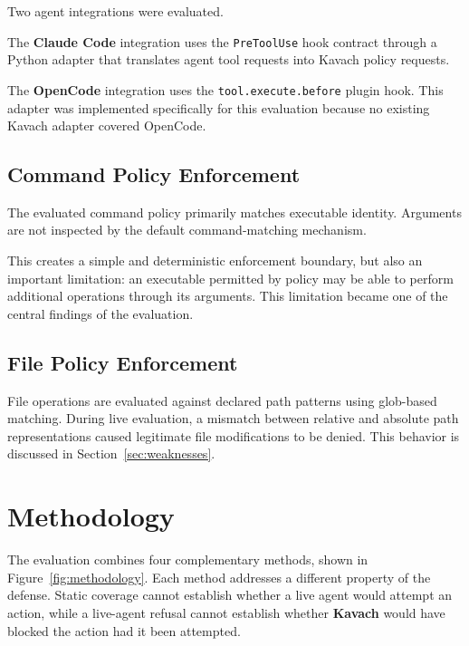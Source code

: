 \documentclass[11pt,a4paper]{article}
\newcommand{\kavach}{\textbf{Kavach}}
\begin{document}
Two agent integrations were evaluated.

The \textbf{Claude Code} integration uses the \texttt{PreToolUse} hook
contract through a Python adapter that translates agent tool requests into
Kavach policy requests.

The \textbf{OpenCode} integration uses the
\texttt{tool.execute.before} plugin hook. This adapter was implemented
specifically for this evaluation because no existing Kavach adapter covered
OpenCode.

\subsection{Command Policy Enforcement}

The evaluated command policy primarily matches executable identity.
Arguments are not inspected by the default command-matching mechanism.

This creates a simple and deterministic enforcement boundary, but also an
important limitation: an executable permitted by policy may be able to
perform additional operations through its arguments. This limitation became
one of the central findings of the evaluation.

\subsection{File Policy Enforcement}

File operations are evaluated against declared path patterns using glob-based
matching. During live evaluation, a mismatch between relative and absolute
path representations caused legitimate file modifications to be denied.
This behavior is discussed in Section~\ref{sec:weaknesses}.


\section{Methodology}

The evaluation combines four complementary methods, shown in
Figure~\ref{fig:methodology}. Each method addresses a different property of
the defense. Static coverage cannot establish whether a live agent would
attempt an action, while a live-agent refusal cannot establish whether
\kavach{} would have blocked the action had it been attempted.
\end{document}
